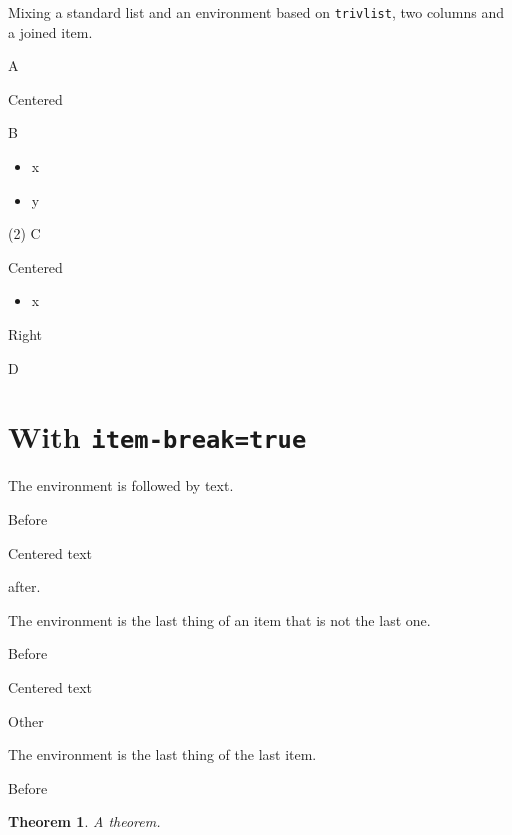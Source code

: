 \documentclass{article}
\newtheorem{thm}{Theorem}
\begin{document}
Mixing a standard list and an environment based on \texttt{trivlist}, two
columns and a joined item.

\begin{enumext*}[columns=2,label=\alph*)]
  \item A \begin{center}Centered\end{center}
  \item B \begin{itemize}\item x \item y\end{itemize}
  \item(2) C \begin{center}Centered\end{center}
    \begin{itemize}\item x\end{itemize}
    \begin{flushright}Right\end{flushright}
  \item D
\end{enumext*}

\section{With \texttt{item-break=true}}

The environment is followed by text.

\begin{enumext*}[columns=1,item-break=true]
  \item Before \begin{center}Centered text\end{center} after.
\end{enumext*}

The environment is the last thing of an item that is not the last one.

\begin{enumext*}[columns=1,item-break=true]
  \item Before \begin{center}Centered text\end{center}
  \item Other
\end{enumext*}

The environment is the last thing of the last item.

\begin{enumext*}[columns=1,item-break=true]
  \item Before \begin{thm}A theorem.\end{thm}
\end{enumext*}
\end{document}
